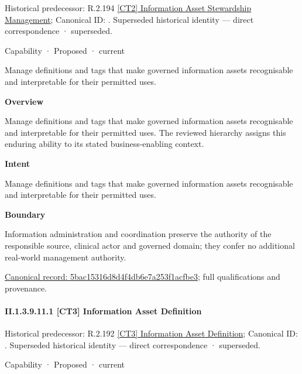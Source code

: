 {\small Historical predecessor: R.2.194 \hyperref[element:cee085c690314802851de71f4741d8db]{[CT2] Information Asset Stewardship Management}; Canonical ID: \texttt{}. Superseded historical identity — direct correspondence · superseded.}\par
\label{element:5bac15316d8d4f4db6e7a253f1acfbe3}
{\small Capability · Proposed · current}\par

Manage definitions and tags that make governed information assets recognisable and interpretable for their permitted uses.



\textbf{Overview}



Manage definitions and tags that make governed information assets recognisable and interpretable for their permitted uses. The reviewed hierarchy assigns this enduring ability to its stated business-enabling context.



\textbf{Intent}



Manage definitions and tags that make governed information assets recognisable and interpretable for their permitted uses.



\textbf{Boundary}



Information administration and coordination preserve the authority of the responsible source, clinical actor and governed domain; they confer no additional real-world management authority.


{\footnotesize \href{../../../../../../../continuum/strategy/capability/5bac15316d8d4f4db6e7a253f1acfbe3.md}{Canonical record: 5bac15316d8d4f4db6e7a253f1acfbe3}; full qualifications and provenance.}\par
\paragraph*{II.1.3.9.11.1 [CT3] Information Asset Definition}
\label{navigation:II.1.3.9.11.1}

{\small Historical predecessor: R.2.192 \hyperref[element:166a22463d2c4534bda7ae31273398b6]{[CT3] Information Asset Definition}; Canonical ID: \texttt{}. Superseded historical identity — direct correspondence · superseded.}\par
\label{element:05c58b2ccfcc45e9a6c70d9a569c4f61}
{\small Capability · Proposed · current}\par

